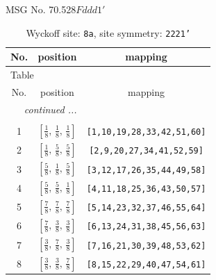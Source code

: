 \documentclass[fleqn,8pt]{jsarticle}
\begin{document}
\setcounter{MaxMatrixCols}{32}

\renewcommand{\tablename}{Table~}
\renewcommand{\figurename}{Figure~}
\begin{center}
\LARGE
MSG No. 70.528\quad$Fddd1'$
\end{center}
\renewcommand{\arraystretch}{1.2}
\begin{longtable}{ccc}
\caption{Wyckoff site: {\tt 8a}, site symmetry: {\tt 2221'}}
 \\
 \hline \hline
No. & position & mapping \\ \hline \endfirsthead

\multicolumn{2}{l}{\tablename\ \thetable{}} \\
 \hline \hline
No. & position & mapping \\ \hline \endhead

 \hline \hline
\multicolumn{2}{r}{\footnotesize\it continued ...} \\ \endfoot

 \hline \hline
\multicolumn{2}{r}{} \\ \endlastfoot

1 & $\left[ \frac{1}{8},\, \frac{1}{8},\, \frac{1}{8} \right]$ & {\tt [1,10,19,28,33,42,51,60]} \\ \hline
2 & $\left[ \frac{1}{8},\, \frac{5}{8},\, \frac{5}{8} \right]$ & {\tt [2,9,20,27,34,41,52,59]} \\ \hline
3 & $\left[ \frac{5}{8},\, \frac{1}{8},\, \frac{5}{8} \right]$ & {\tt [3,12,17,26,35,44,49,58]} \\ \hline
4 & $\left[ \frac{5}{8},\, \frac{5}{8},\, \frac{1}{8} \right]$ & {\tt [4,11,18,25,36,43,50,57]} \\ \hline
5 & $\left[ \frac{7}{8},\, \frac{7}{8},\, \frac{7}{8} \right]$ & {\tt [5,14,23,32,37,46,55,64]} \\ \hline
6 & $\left[ \frac{7}{8},\, \frac{3}{8},\, \frac{3}{8} \right]$ & {\tt [6,13,24,31,38,45,56,63]} \\ \hline
7 & $\left[ \frac{3}{8},\, \frac{7}{8},\, \frac{3}{8} \right]$ & {\tt [7,16,21,30,39,48,53,62]} \\ \hline
8 & $\left[ \frac{3}{8},\, \frac{3}{8},\, \frac{7}{8} \right]$ & {\tt [8,15,22,29,40,47,54,61]} \\
\end{longtable}
\renewcommand{\arraystretch}{1.2}
\end{document}
